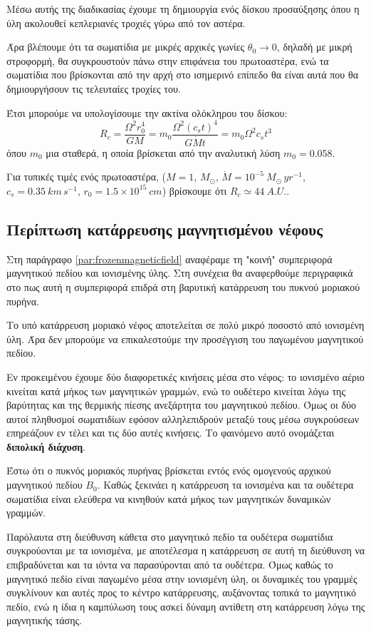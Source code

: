 \documentclass[a4paper,12pt]{memoir}
\newcommand{\e}[1]{\times 10^{#1}}
\begin{document}
Μέσω αυτής της διαδικασίας έχουμε τη δημιουργία ενός δίσκου προσαύξησης όπου η ύλη ακολουθεί κεπλεριανές τροχιές γύρω από τον αστέρα.

Άρα βλέπουμε ότι τα σωματίδια με μικρές αρχικές γωνίες $\theta _0 \to 0$, δηλαδή με μικρή στροφορμή, θα συγκρουστούν πάνω στην επιφάνεια του πρωτοαστέρα, ενώ τα σωματίδια που βρίσκονται από την αρχή στο ισημερινό επίπεδο θα είναι αυτά που θα δημιουργήσουν τις τελευταίες τροχίες του. 

Έτσι μπορούμε να υπολογίσουμε την ακτίνα ολόκληρου του δίσκου:
\begin{equation}
R_c=\frac{\Omega^2 r_0 ^4}{GM} = m_0 \frac{\Omega^2 (c_s t)^4}{G \dot{M} t} =m_0 \Omega ^2 c_s t^3
\end{equation}
όπου $m_0$ μια σταθερά, η οποία βρίσκεται από την αναλυτική λύση $m_0=0.058$. 

Για τυπικές τιμές ενός πρωτοαστέρα, ($M=1$, $M_{\odot}$, $\dot{M}=10^{-5} \ M_{\odot} \, yr^{-1}$, $c_s =0.35\ km\, s^{-1}$, $r_0 = 1.5 \e{15}\ cm$) βρίσκουμε ότι $R_c \simeq 44\ A.U.$.  

\subsection{Περίπτωση κατάρρευσης μαγνητισμένου νέφους}
Στη παράγραφο \ref{par:frozenmagneticfield} αναφέραμε τη "κοινή" συμπεριφορά μαγνητικού πεδίου και ιονισμένης ύλης. Στη συνέχεια θα αναφερθούμε περιγραφικά στο πως αυτή η συμπεριφορά επιδρά στη βαρυτική κατάρρευση του πυκνού μοριακού πυρήνα.

Το υπό κατάρρευση μοριακό νέφος αποτελείται σε πολύ μικρό ποσοστό από ιονισμένη ύλη. Άρα δεν μπορούμε να επικαλεστούμε την προσέγγιση του παγωμένου μαγνητικού πεδίου. 

Εν προκειμένου έχουμε δύο διαφορετικές κινήσεις μέσα στο νέφος: το ιονισμένο αέριο κινείται κατά μήκος των μαγνητικών γραμμών, ενώ το ουδέτερο κινείται λόγω της βαρύτητας και της θερμικής πίεσης ανεξάρτητα του μαγνητικού πεδίου.
Όμως οι δύο αυτοί πληθυσμοί σωματιδίων εφόσον αλληλεπιδρούν μεταξύ τους μέσω συγκρούσεων επηρεάζουν εν τέλει και τις δύο αυτές κινήσεις. Το φαινόμενο αυτό ονομάζεται \textbf{διπολική διάχυση}.

Έστω ότι ο πυκνός μοριακός πυρήνας βρίσκεται εντός ενός ομογενούς αρχικού μαγνητικού πεδίου $B_0$. Καθώς ξεκινάει η κατάρρευση τα ιονισμένα και τα ουδέτερα σωματίδια είναι ελεύθερα να κινηθούν κατά μήκος των μαγνητικών δυναμικών γραμμών. 

Παρόλαυτα στη διεύθυνση κάθετα στο μαγνητικό πεδίο τα ουδέτερα σωματίδια συγκρούονται με τα ιονισμένα, με αποτέλεσμα η κατάρρευση σε αυτή τη διεύθυνση να επιβραδύνεται και τα ιόντα να παρασύρονται από τα ουδέτερα. Όμως καθώς το μαγνητικό πεδίο είναι παγωμένο μέσα στην ιονισμένη ύλη, οι δυναμικές του γραμμές συγκλίνουν και αυτές προς το κέντρο κατάρρευσης, αυξάνοντας τοπικά το μαγνητικό πεδίο, ενώ η ίδια η καμπύλωση τους ασκεί δύναμη αντίθετη στη κατάρρευση λόγω της μαγνητικής τάσης. 
\end{document}
